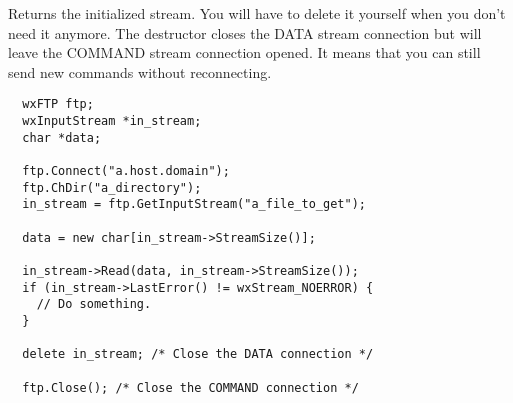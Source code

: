 Returns the initialized stream. You will have to delete it yourself when you
don't need it anymore. The destructor closes the DATA stream connection but
will leave the COMMAND stream connection opened. It means that you can still
send new commands without reconnecting.


\begin{verbatim}
  wxFTP ftp;
  wxInputStream *in_stream;
  char *data;

  ftp.Connect("a.host.domain");
  ftp.ChDir("a_directory");
  in_stream = ftp.GetInputStream("a_file_to_get");

  data = new char[in_stream->StreamSize()];

  in_stream->Read(data, in_stream->StreamSize());
  if (in_stream->LastError() != wxStream_NOERROR) {
    // Do something.
  }

  delete in_stream; /* Close the DATA connection */

  ftp.Close(); /* Close the COMMAND connection */
\end{verbatim}



